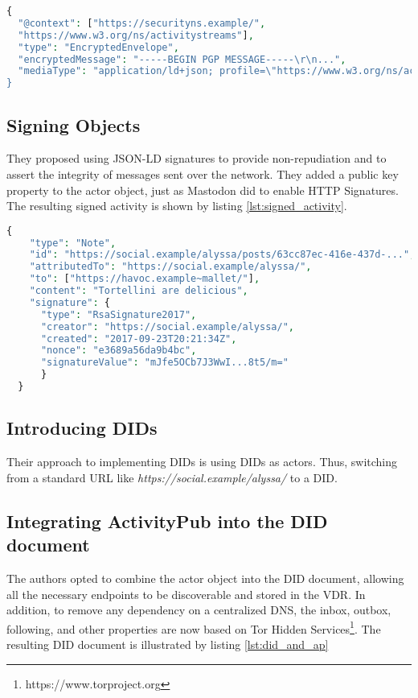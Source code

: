 \lstset{style=JSONStyle}
\begin{lstlisting}[language=PHP, caption=Note object with encrypted content \cite{webber_sporny_2017}, label=lst:ap_encrypted, float=h]
{
  "@context": ["https://securityns.example/",
  "https://www.w3.org/ns/activitystreams"],
  "type": "EncryptedEnvelope",
  "encryptedMessage": "-----BEGIN PGP MESSAGE-----\r\n...",
  "mediaType": "application/ld+json; profile=\"https://www.w3.org/ns/activitystreams\"
}
\end{lstlisting}

\subsection*{\textbf{Signing Objects}}
They proposed using JSON-LD signatures to provide non-repudiation and to assert the integrity of messages sent over the network. They added a public key property to the actor object, just as Mastodon did to enable HTTP Signatures. The resulting signed activity is shown by listing \ref{lst:signed_activity}.

\lstset{style=JSONStyle}
\begin{lstlisting}[language=PHP, caption=Note object with JSON-LD Signature. Adapted from \cite{webber_sporny_2017}, label=lst:signed_activity, float=h]
  {
    "type": "Note",
    "id": "https://social.example/alyssa/posts/63cc87ec-416e-437d-...",
    "attributedTo": "https://social.example/alyssa/",
    "to": ["https://havoc.example~mallet/"],
    "content": "Tortellini are delicious",
    "signature": {
      "type": "RsaSignature2017",
      "creator": "https://social.example/alyssa/",
      "created": "2017-09-23T20:21:34Z",
      "nonce": "e3689a56da9b4bc",
      "signatureValue": "mJfe5OCb7J3WwI...8t5/m="
      }
  }
\end{lstlisting}

\subsection*{\textbf{Introducing DIDs}}
Their approach to implementing DIDs is using DIDs as actors. Thus, switching from a standard URL like \emph{https://social.example/alyssa/} to a DID. 

\subsection*{\textbf{Integrating ActivityPub into the DID document}}

The authors opted to combine the actor object into the DID document, allowing all the necessary endpoints to be discoverable and stored in the VDR. In addition, to remove any dependency on a centralized DNS, the inbox, outbox, following, and other properties are now based on Tor Hidden Services\footnote{https://www.torproject.org}. The resulting DID document is illustrated by listing \ref{lst:did_and_ap}

